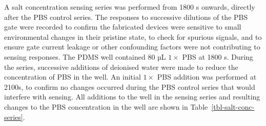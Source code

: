 \documentclass[
  letterpaper,
  DIV=11,
  numbers=noendperiod]{scrartcl}
\begin{document}
A salt concentration sensing series was performed from 1800 s onwards,
directly after the PBS control series. The responses to successive
dilutions of the PBS gate were recorded to confirm the fabricated
devices were sensitive to small environmental changes in their pristine
state, to check for spurious signals, and to ensure gate current leakage
or other confounding factors were not contributing to sensing responses.
The PDMS well contained 80 µL \(1 \times\) PBS at 1800 s. During the
series, successive additions of deionised water were made to reduce the
concentration of PBS in the well. An initial \(1 \times\) PBS addition
was performed at 2100s, to confirm no changes occurred during the PBS
control series that would interfere with sensing. All additions to the
well in the sensing series and resulting changes to the PBS
concentration in the well are shown in Table~\ref{tbl-salt-conc-series}.
\end{document}

